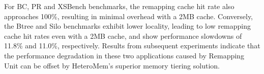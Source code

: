 For BC, PR and XSBench benchmarks, the remapping cache hit rate also approaches 100\%, resulting in minimal overhead with a 2MB cache. 
Conversely, the Btree and Silo benchmarks exhibit lower locality, leading to low remapping cache hit rates even with a 2MB cache, and show performance slowdowns of 11.8\% and 11.0\%, respectively. 
Results from subsequent experiments indicate that the performance degradation in these two applications caused by Remapping Unit can be offset by HeteroMem's superior memory tiering solution.






